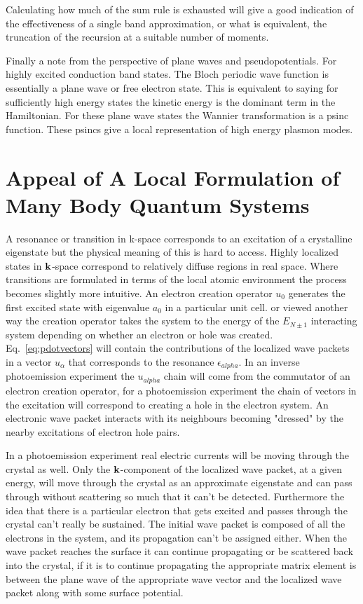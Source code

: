 Calculating how much of the sum rule is exhausted will give a good indication
of the effectiveness of a single band approximation, or what is equivalent,
the truncation of the recursion at a suitable number of moments.

Finally a note from the perspective of plane waves and pseudopotentials. For
highly excited conduction band states. The Bloch periodic wave function is
essentially a plane wave or free electron state. This is equivalent to saying for
sufficiently high energy states the kinetic energy is the dominant term in the Hamiltonian.
For these plane wave states the Wannier transformation is a psinc function. These psincs
give a local representation of high energy plasmon modes.

\section{Appeal of A Local Formulation of Many Body Quantum Systems}
 A resonance or transition in k-space corresponds to an excitation 
of a crystalline eigenstate but the physical meaning of this is hard to access. Highly
localized states in ${\bf k}$-space correspond to relatively diffuse regions in real space. Where
transitions are formulated in terms of the local atomic environment the process becomes slightly
more intuitive. An electron creation operator $u_{0}$ generates the 
first excited state with eigenvalue $a_{0}$ in a particular unit cell. 
or viewed another way the creation operator takes the system to the energy 
of the $E_{N\pm1}$ interacting system depending on whether an electron or hole
was created. Eq.~\ref{eq:pdotvectors} will contain the contributions of the localized
wave packets in a vector $u_{\alpha}$ that corresponds to the resonance 
$\epsilon_{alpha}$. In an inverse photoemission experiment the $u_{alpha}$ chain
will come from the commutator of an electron creation operator, for a photoemission
experiment the chain of vectors in the excitation will correspond to creating a hole
in the electron system. An electronic wave packet interacts with its neighbours becoming
"dressed" by the nearby excitations of electron hole pairs. 

In a photoemission experiment real electric currents will be moving through the crystal as well.
Only the ${\bf k}$-component of the localized wave packet, at a given energy, will move through the crystal as 
an approximate eigenstate and can pass through without scattering so much that it can't be detected.
Furthermore the idea that there is a particular electron that gets excited and passes through the crystal
can't really be sustained. The initial wave packet is composed of all the electrons in the system, and its
propagation can't be assigned either. When the wave packet reaches the surface it can continue propagating
or be scattered back into the crystal, if it is to continue propagating the appropriate matrix element
is between the plane wave of the appropriate wave vector and the localized wave packet along with some
surface potential.

